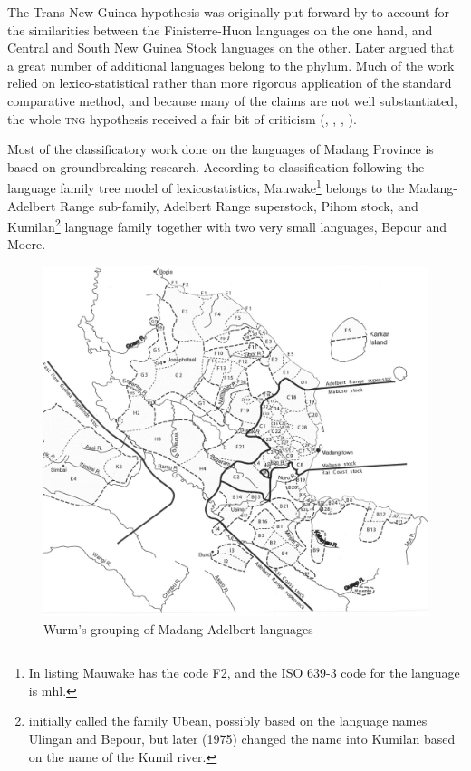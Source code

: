 The Trans New Guinea hypothesis was originally put forward by \citet{McElhanonEtAL1970} to account for the similarities between the Finisterre-Huon languages on the one hand, and Central and South New Guinea Stock languages on the other. Later \citet{Wurm1975} argued that a great number of additional languages belong to the phylum.  Much of the work relied on lexico-statistical rather than more rigorous application of the standard comparative method, and because many of the claims are not well substantiated, the whole \textsc{tng} hypothesis received a fair bit of criticism (\citealt{Lang1976}, \citealt{Haiman1979}, \citealt{Foley1986}, \citealt{Pawley1995}).

Most of the classificatory work done on the languages of Madang Province is based on \citet{ZGraggen1971,ZGraggen1975} groundbreaking research.  According to  classification following the language family tree model of lexicostatistics, Mauwake\footnote{In  listing Mauwake has the code F2, and the ISO 639-3 code for the language is mhl.} belongs to the Madang-Adelbert Range sub-family, Adelbert Range superstock, Pihom stock, and Kumilan\footnote{\citet{ZGraggen1971} initially called the family Ubean, possibly based on the language names Ulingan and Bepour, but later (1975) changed the name into Kumilan based on the name of the Kumil river.} language family together with two very small languages, Bepour and Moere. 




\begin{figure}
\caption{Wurm's grouping of Madang-Adelbert languages \citep [Map~3]{Ross1996}}
\label{map:3:MadangWurm}
\includegraphics[width=\textwidth]{figures/1-wurms_grouping_of_madang_adelbert_languages.jpeg}
\end{figure}

